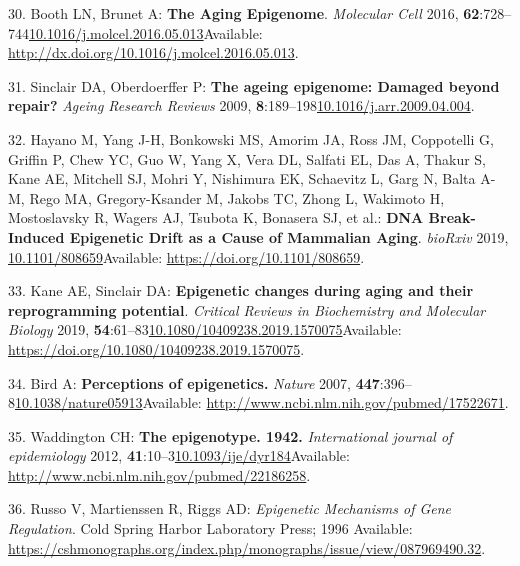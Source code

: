 \documentclass[
]{book}
\begin{document}
\leavevmode\hypertarget{ref-Booth2016}{}%
30. Booth LN, Brunet A: \textbf{The Aging Epigenome}. \emph{Molecular Cell} 2016, \textbf{62}:728--744\href{https://doi.org/10.1016/j.molcel.2016.05.013}{10.1016/j.molcel.2016.05.013}Available: \url{http://dx.doi.org/10.1016/j.molcel.2016.05.013}.

\leavevmode\hypertarget{ref-Sinclair2009}{}%
31. Sinclair DA, Oberdoerffer P: \textbf{The ageing epigenome: Damaged beyond repair?} \emph{Ageing Research Reviews} 2009, \textbf{8}:189--198\href{https://doi.org/10.1016/j.arr.2009.04.004}{10.1016/j.arr.2009.04.004}.

\leavevmode\hypertarget{ref-Hayano2019}{}%
32. Hayano M, Yang J-H, Bonkowski MS, Amorim JA, Ross JM, Coppotelli G, Griffin P, Chew YC, Guo W, Yang X, Vera DL, Salfati EL, Das A, Thakur S, Kane AE, Mitchell SJ, Mohri Y, Nishimura EK, Schaevitz L, Garg N, Balta A-M, Rego MA, Gregory-Ksander M, Jakobs TC, Zhong L, Wakimoto H, Mostoslavsky R, Wagers AJ, Tsubota K, Bonasera SJ, et al.: \textbf{DNA Break-Induced Epigenetic Drift as a Cause of Mammalian Aging}. \emph{bioRxiv} 2019, \href{https://doi.org/10.1101/808659}{10.1101/808659}Available: \url{https://doi.org/10.1101/808659}.

\leavevmode\hypertarget{ref-Kane2019}{}%
33. Kane AE, Sinclair DA: \textbf{Epigenetic changes during aging and their reprogramming potential}. \emph{Critical Reviews in Biochemistry and Molecular Biology} 2019, \textbf{54}:61--83\href{https://doi.org/10.1080/10409238.2019.1570075}{10.1080/10409238.2019.1570075}Available: \url{https://doi.org/10.1080/10409238.2019.1570075}.

\leavevmode\hypertarget{ref-Bird2007}{}%
34. Bird A: \textbf{Perceptions of epigenetics.} \emph{Nature} 2007, \textbf{447}:396--8\href{https://doi.org/10.1038/nature05913}{10.1038/nature05913}Available: \url{http://www.ncbi.nlm.nih.gov/pubmed/17522671}.

\leavevmode\hypertarget{ref-Waddington1942}{}%
35. Waddington CH: \textbf{The epigenotype. 1942.} \emph{International journal of epidemiology} 2012, \textbf{41}:10--3\href{https://doi.org/10.1093/ije/dyr184}{10.1093/ije/dyr184}Available: \url{http://www.ncbi.nlm.nih.gov/pubmed/22186258}.

\leavevmode\hypertarget{ref-Russo1996}{}%
36. Russo V, Martienssen R, Riggs AD: \emph{Epigenetic Mechanisms of Gene Regulation}. Cold Spring Harbor Laboratory Press; 1996 Available: \url{https://cshmonographs.org/index.php/monographs/issue/view/087969490.32}.
\end{document}

